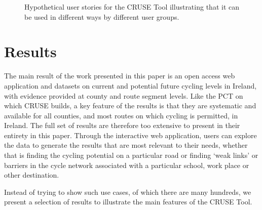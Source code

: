 \documentclass[
  super,
  preprint,
  3p]{elsarticle}
\begin{document}
\begin{figure}


\caption{\label{fig-user-stories}Hypothetical user stories for the CRUSE
Tool illustrating that it can be used in different ways by different
user groups.}

\end{figure}%

\section{Results}\label{sec-results}

The main result of the work presented in this paper is an open access
web application and datasets on current and potential future cycling
levels in Ireland, with evidence provided at county and route segment
levels. Like the PCT on which CRUSE builds, a key feature of the results
is that they are systematic and available for all counties, and most
routes on which cycling is permitted, in Ireland. The full set of
results are therefore too extensive to present in their entirety in this
paper. Through the interactive web application, users can explore the
data to generate the results that are most relevant to their needs,
whether that is finding the cycling potential on a particular road or
finding `weak links' or barriers in the cycle network associated with a
particular school, work place or other destination.

Instead of trying to show such use cases, of which there are many
hundreds, we present a selection of results to illustrate the main
features of the CRUSE Tool.
\end{document}
